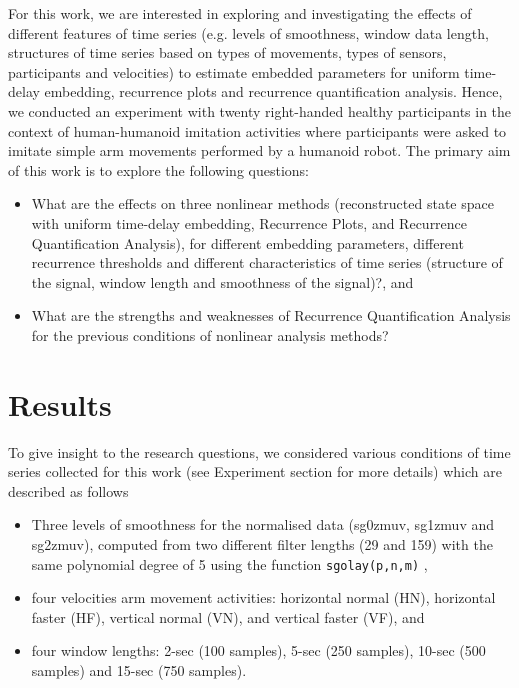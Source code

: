 \documentclass[fleqn,10pt]{wlscirep}
\begin{document}
For this work, we are interested in exploring and investigating  
the effects of different features of time series 
(e.g. levels of smoothness, window data length,
structures of time series based on types of movements, 
types of sensors, participants and velocities) to estimate 
embedded parameters for uniform time-delay embedding, 
recurrence plots and recurrence quantification analysis.
Hence, we conducted an experiment with twenty right-handed 
healthy participants in the context of human-humanoid imitation 
activities where participants were asked to 
imitate simple arm movements performed by a humanoid robot.
The primary aim of this work is to explore the following questions:
\begin{itemize}
\item What are the effects on three nonlinear methods 
	(reconstructed state space with uniform time-delay embedding, 
	Recurrence Plots, and Recurrence Quantification Analysis), 
	for different embedding parameters, different recurrence thresholds 
	and different characteristics of time series 
	(structure of the signal, window length and smoothness of the signal)?, and 
\item What are the strengths and weaknesses of Recurrence
	Quantification Analysis for the previous conditions
	of nonlinear analysis methods?
\end{itemize}


\section*{Results}
To give insight to the research questions, 
we considered various conditions of time series collected for this work 
(see Experiment section for more details) which are described as follows
\begin{itemize}
\item Three levels of smoothness for the normalised data 
	(sg0zmuv, sg1zmuv and sg2zmuv), computed from two different filter 
	lengths (29 and 159) with the same polynomial degree 
	of 5 using the function \texttt{sgolay(p,n,m)} \cite{Rsignal},
\item four velocities arm movement activities: 
	horizontal normal (HN), horizontal faster (HF), 
	vertical normal (VN), and vertical faster (VF), and
\item four window lengths: 2-sec (100 samples), 5-sec (250 samples), 
	10-sec (500 samples) and 15-sec (750 samples).
\end{itemize}
\end{document}
